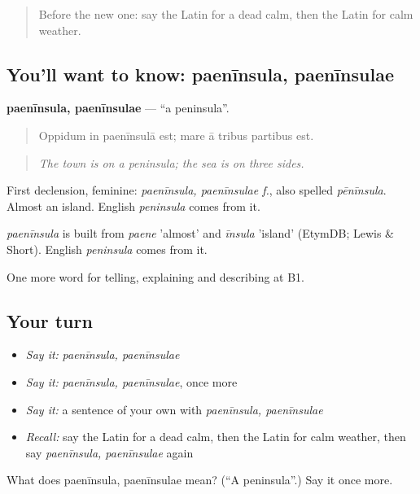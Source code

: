 \begin{quote}
Before the new one: say the Latin for a dead calm, then the Latin for calm weather.
\end{quote}

\subsection*{You'll want to know: paenīnsula, paenīnsulae}
\textbf{paenīnsula, paenīnsulae} — \textquotedblleft{}a peninsula\textquotedblright{}.

\begin{quote}
Oppidum in paenīnsulā est; mare ā tribus partibus est.
\end{quote}

\begin{quote}
\emph{The town is on a peninsula; the sea is on three sides.}
\end{quote}

First declension, feminine: \emph{paenīnsula, paenīnsulae f.}, also spelled \emph{pēnīnsula}. Almost an island. English \emph{peninsula} comes from it.

\begin{cousinweb}
\emph{paenīnsula} is built from \emph{paene} 'almost' and \emph{īnsula} 'island' (EtymDB; Lewis \& Short). English \emph{peninsula} comes from it.
\end{cousinweb}

\begin{grammarlens}[title={What you've built}]
One more word for telling, explaining and describing at B1.
\end{grammarlens}

\subsection*{Your turn}
\begin{itemize}
\raggedright
  \item \emph{Say it:} \emph{paenīnsula, paenīnsulae}
  \item \emph{Say it:} \emph{paenīnsula, paenīnsulae}, once more
  \item \emph{Say it:} a sentence of your own with \emph{paenīnsula, paenīnsulae}
  \item \emph{Recall:} say the Latin for a dead calm, then the Latin for calm weather, then say \emph{paenīnsula, paenīnsulae} again
\end{itemize}

\begin{tcolorbox}[breakable,colback=teal!4,colframe=teal!35!black,title={Before you move on}]
What does paenīnsula, paenīnsulae mean? (\textquotedblleft{}A peninsula\textquotedblright{}.) Say it once more.
\end{tcolorbox}
